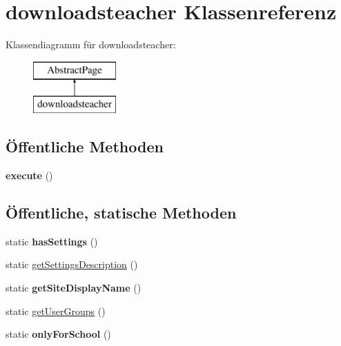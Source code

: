 \hypertarget{classdownloadsteacher}{}\section{downloadsteacher Klassenreferenz}
\label{classdownloadsteacher}
Klassendiagramm für downloadsteacher\+:\begin{figure}[H]
\begin{center}
\leavevmode
\includegraphics[height=2.000000cm]{classdownloadsteacher}
\end{center}
\end{figure}
\subsection*{Öffentliche Methoden}
\begin{DoxyCompactItemize}
\item 
\mbox{\label{classdownloadsteacher_abc64265230f4a19c2e3cdb060bd392c9}} 
{\bfseries execute} ()
\end{DoxyCompactItemize}
\subsection*{Öffentliche, statische Methoden}
\begin{DoxyCompactItemize}
\item 
\mbox{\label{classdownloadsteacher_ad3264cac19a00724f3e83fe27722a2af}} 
static {\bfseries has\+Settings} ()
\item 
static \mbox{\hyperlink{classdownloadsteacher_a95714429550efcfac8a294c1341de6e9}{get\+Settings\+Description}} ()
\item 
\mbox{\label{classdownloadsteacher_a9a7d379cba8fa720ea999ccb5d80799e}} 
static {\bfseries get\+Site\+Display\+Name} ()
\item 
static \mbox{\hyperlink{classdownloadsteacher_a5e8bf7c91c94fe97b2bc25dda24a4daf}{get\+User\+Groups}} ()
\item 
\mbox{\label{classdownloadsteacher_a00cda2bc037365fac78feeac37e18b3a}} 
static {\bfseries only\+For\+School} ()
\end{DoxyCompactItemize}
